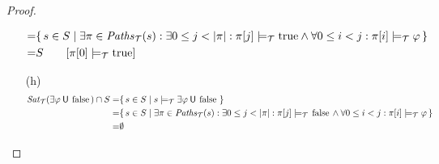 \documentclass[12pt]{article}
\newcommand{\until}{\mathbin{\sf U}}
\newcommand{\TRUE}{\mbox{\lstinline{true}}}
\newcommand{\FALSE}{\mbox{\lstinline{false}}}
\theoremstyle{definition}
\newcommand{\comment}[1]{\hspace{2em}[\mbox{#1}]}
\begin{document}
\begin{proof}
\begin{itemize}
\begin{align*}
= & \{\, s \in S \mid \exists \pi \in \mathit{Paths}_{\mathcal{T}}(s) : \exists 0 \leq j < |\pi| : \pi[j] \models_{\mathcal{T}} \TRUE \wedge \forall 0 \leq i < j : \pi[i] \models_{\mathcal{T}} \varphi \,\}\\
= & S
\comment{$\pi[0] \models_{\mathcal{T}} \TRUE$}
\end{align*}
\item[(h)]
\begin{align*}
\mathit{Sat}_{\mathcal{T}}(\exists \varphi \until \FALSE) \cap S
= & \{\, s \in S \mid s \models_{\mathcal{T}} \exists \varphi \until \FALSE \,\}\\
= & \{\, s \in S \mid \exists \pi \in \mathit{Paths}_{\mathcal{T}}(s) : \exists 0 \leq j < |\pi| : \pi[j] \models_{\mathcal{T}} \FALSE \wedge \forall 0 \leq i < j : \pi[i] \models_{\mathcal{T}} \varphi \,\}\\
= & \emptyset                                                                                                                                                                                                                                                                                                                                                                                                                                                                                                                                                                                                                                                                                                                                                                                                                                                                                                                                                                                                                                                                                                                                                                                                                                                                                                                                                                                                                                                                                                                                                                                                                                                                                                                                                                      
\end{align*}
\end{itemize}
\end{proof}
\end{document}
